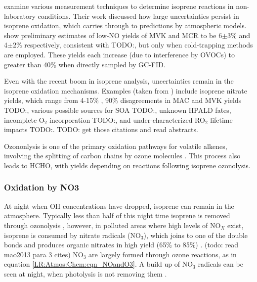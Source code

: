       \textcite{Nguyen2014} examine various measurement techniques to determine isoprene reactions in non-laboratory conditions.
      Their work discussed how large uncertainties persist in isoprene oxidation, which carries through to predictions by atmospheric models.
      \textcite{Nguyen2014} show preliminary estimates of low-NO yields of MVK and MCR to be 6$\pm3\%$ and 4$\pm2\%$ respectively, consistent with TODO:\textcite{Liu2013}, but only when cold-trapping methods are employed.
      These yields each increase (due to interference by OVOCs) to greater than 40\% when directly sampled by GC-FID.
      
      Even with the recent boom in isoprene analysis, uncertainties remain in the isoprene oxidation mechanisms.
      Examples (taken from \textcite{Nguyen2014}) include isoprene nitrate yields, which range from 4-15\% \parencite{Paulot2009a}, 90\% disagreements in MAC and MVK yields TODO:\parencite{Liu2013}, various possible sources for SOA TODO:\parencite{Chan2010, Surratt2010, Lin2013}, unknown HPALD fates, incomplete O$_2$ incorporation TODO:\parencite{Peeters2009,Crounse2013}, and under-characterized RO$_2$ lifetime impacts TODO:\parencite{Wolfe2012}. TODO: get those citations and read abstracts.
    
      Ozononlysis is one of the primary oxidation pathways for volatile alkenes, involving the splitting of carbon chains by ozone molecules \parencite{Nguyen2016}.
      This process also leads to HCHO, with yields depending on reactions following isoprene ozonolysis.
    
    \subsubsection{Oxidation by NO3}
      At night when OH concentrations have dropped, isoprene can remain in the atmosphere.
      Typically less than half of this night time isoprene is removed through ozonolysis \parencite{AtkinsonArey2003}, however, in polluted areas where high levels of NO$_X$ exist, isoprene is consumed by nitrate radicals (NO$_3$), which joins to one of the double bonds and produces organic nitrates in high yield (65\% to 85\%) \parencite{Mao2013}. (todo: read mao2013 para 3 cites)
      NO$_3$ are largely formed through ozone reactions, as in equation \ref{LR:Atmos:Chem:eqn_NOandO3}.
      A build up of NO$_3$ radicals can be seen at night, when photolysis is not removing them \parencite{Atkinson2000,Brown2009}.
      
